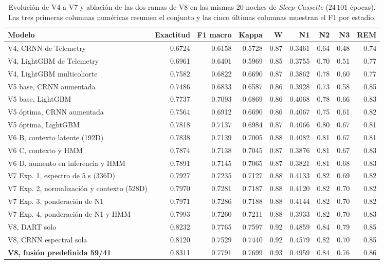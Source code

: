 \documentclass[conference]{IEEEtran}
\begin{document}
\begin{table}[!t]
\centering
\caption{Evolución de V4 a V7 y ablación de las dos ramas de V8 en las mismas 20 noches de \textit{Sleep-Cassette} ($24\,101$ épocas). Las tres primeras columnas numéricas resumen el conjunto y las cinco últimas columnas muestran el F1 por estadio.}
\label{tab:global_metrics}
\small
\setlength{\tabcolsep}{3pt}
\begin{tabular*}{\textwidth}{@{\extracolsep{\fill}}lrrrrrrrr@{}}
\hline
\textbf{Modelo} & \textbf{Exactitud} & \textbf{F1 macro} & \textbf{Kappa} & \textbf{W} & \textbf{N1} & \textbf{N2} & \textbf{N3} & \textbf{REM} \\ \hline
V4, CRNN de Telemetry & 0.6724 & 0.6158 & 0.5728 & 0.87 & 0.3461 & 0.64 & 0.48 & 0.74 \\
V4, LightGBM de Telemetry & 0.6961 & 0.6401 & 0.5969 & 0.85 & 0.3755 & 0.70 & 0.51 & 0.77 \\
V4, LightGBM multicohorte & 0.7582 & 0.6822 & 0.6690 & 0.87 & 0.3862 & 0.78 & 0.60 & 0.77 \\
\hline
V5 base, CRNN aumentada & 0.7486 & 0.6833 & 0.6587 & 0.86 & 0.3928 & 0.73 & 0.58 & 0.85 \\
V5 base, LightGBM & 0.7737 & 0.7093 & 0.6869 & 0.86 & 0.4068 & 0.78 & 0.66 & 0.83 \\
V5 óptima, CRNN aumentada & 0.7564 & 0.6912 & 0.6690 & 0.86 & 0.4067 & 0.75 & 0.61 & 0.82 \\
V5 óptima, LightGBM & 0.7818 & 0.7137 & 0.6984 & 0.87 & 0.4066 & 0.80 & 0.67 & 0.81 \\
\hline
V6 B, contexto latente (192D) & 0.7838 & 0.7139 & 0.7005 & 0.88 & 0.4082 & 0.81 & 0.67 & 0.81 \\
V6 C, contexto y HMM & 0.7874 & 0.7138 & 0.7045 & 0.87 & 0.3876 & 0.81 & 0.67 & 0.83 \\
V6 D, aumento en inferencia y HMM & 0.7891 & 0.7145 & 0.7065 & 0.87 & 0.3821 & 0.81 & 0.68 & 0.83 \\
\hline
V7 Exp. 1, espectro de 5 s (336D) & 0.7927 & 0.7235 & 0.7127 & 0.88 & 0.4133 & 0.82 & 0.69 & 0.82 \\
V7 Exp. 2, normalización y contexto (528D) & 0.7970 & 0.7281 & 0.7187 & 0.88 & 0.4120 & 0.82 & 0.70 & 0.82 \\
V7 Exp. 3, ponderación de N1 & 0.7971 & 0.7286 & 0.7188 & 0.88 & 0.4144 & 0.82 & 0.70 & 0.82 \\
V7 Exp. 4, ponderación de N1 y HMM & 0.7993 & 0.7260 & 0.7211 & 0.88 & 0.3933 & 0.82 & 0.70 & 0.83 \\
\hline
V8, DART solo & 0.8232 & 0.7765 & 0.7597 & 0.92 & 0.4859 & 0.84 & 0.79 & 0.85 \\
V8, CRNN espectral sola & 0.8120 & 0.7529 & 0.7440 & 0.92 & 0.4579 & 0.82 & 0.70 & 0.85 \\
\textbf{V8, fusión predefinida 59/41} & 0.8311 & 0.7791 & 0.7699 & 0.93 & 0.4959 & 0.84 & 0.76 & 0.86 \\
\hline
\end{tabular*}
\end{table}
\end{document}
